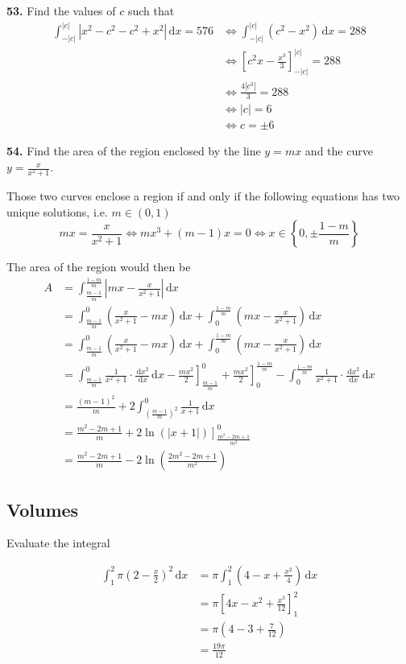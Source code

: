 \documentclass[a4paper,12pt]{article}
\newcommand{\ud}{\,\mathrm{d}}
\begin{document}
\noindent\textbf{53. }Find the values of $c$ such that
\begin{align*}
      \int_{-|c|}^{|c|}\left|x^2 - c^2 - c^2 + x^2\right|\ud x = 576
&\iff \int_{-|c|}^{|c|}\left(c^2 - x^2\right)\ud x = 288\\
&\iff \left[c^2 x - \frac{x^3}{3}\right]_{-|c|}^{|c|} = 288\\
&\iff \frac{4\left|c^3\right|}{3} = 288\\
&\iff |c| = 6\\
&\iff c = \pm 6
\end{align*}

\noindent\textbf{54. }Find the area of the region enclosed by the line $y = mx$
and the curve $y = \frac{x}{x^2 + 1}$.

Those two curves enclose a region if and only if the following equations has
two unique solutions, i.e. $m \in (0, 1)$
\[mx = \frac{x}{x^2 + 1} \iff mx^3 + (m - 1)x = 0
  \iff x \in \left\{0, \pm\frac{1 - m}{m}\right\}\]

The area of the region would then be
\begin{align*}
A&=\int_{\frac{m-1}{m}}^{\frac{1-m}{m}}\left|mx - \frac{x}{x^2 + 1}\right|\ud x\\
 &=\int_{\frac{m-1}{m}}^0\left(\frac{x}{x^2 + 1} - mx\right)\ud x +
   \int_0^{\frac{1-m}{m}}\left(mx - \frac{x}{x^2 + 1}\right)\ud x\\
 &=\int_{\frac{m-1}{m}}^0\left(\frac{x}{x^2 + 1} - mx\right)\ud x +
   \int_0^{\frac{1-m}{m}}\left(mx - \frac{x}{x^2 + 1}\right)\ud x\\
 &=\int_{\frac{m-1}{m}}^0\frac{1}{x^2 + 1}\cdot\frac{\ud x^2}{\ud x}\ud x -
   \left.\frac{mx^2}{2}\right]_{\frac{m-1}{m}}^0 +
   \left.\frac{mx^2}{2}\right]_0^{\frac{1-m}{m}} -
   \int_0^{\frac{1-m}{m}}\frac{1}{x^2 + 1}\cdot\frac{\ud x^2}{\ud x}\ud x\\
 &=\frac{(m - 1)^2}{m} +
   2\int_{\left(\frac{m-1}{m}\right)^2}^0\frac{1}{x + 1}\ud x\\
 &=\frac{m^2 - 2m + 1}{m} +
   2\left.\ln(|x + 1|)\right]_{\frac{m^2 - 2m + 1}{m^2}}^0\\
 &=\frac{m^2 - 2m + 1}{m} -
   2\ln\left(\frac{2m^2 - 2m + 1}{m^2}\right)
\end{align*}

\subsection{Volumes}
Evaluate the integral

\begin{align*}
  \int_1^2\pi\left(2 - \frac{x}{2}\right)^2 \ud x
&=\pi\int_1^2\left(4 - x + \frac{x^2}{4}\right)\ud x\\
&=\pi\left[4x - x^2 + \frac{x^3}{12}\right]_1^2\\
&=\pi\left(4 - 3 + \frac{7}{12}\right)\\
&=\frac{19\pi}{12}\tag{1}
\end{align*}
\end{document}
